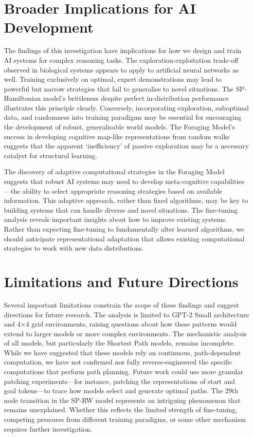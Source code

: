\section{Broader Implications for AI Development}

The findings of this investigation have implications for how we design and train AI systems for complex reasoning tasks. The exploration-exploitation trade-off observed in biological systems appears to apply to artificial neural networks as well. Training exclusively on optimal, expert demonstrations may lead to powerful but narrow strategies that fail to generalise to novel situations. The SP-Hamiltonian model's brittleness despite perfect in-distribution performance illustrates this principle clearly. Conversely, incorporating exploration, suboptimal data, and randomness into training paradigms may be essential for encouraging the development of robust, generalisable world models. The Foraging Model's success in developing cognitive map-like representations from random walks suggests that the apparent `inefficiency' of passive exploration may be a necessary catalyst for structural learning. 

The discovery of adaptive computational strategies in the Foraging Model suggests that robust AI systems may need to develop meta-cognitive capabilities—the ability to select appropriate reasoning strategies based on available information. This adaptive approach, rather than fixed algorithms, may be key to building systems that can handle diverse and novel situations. The fine-tuning analysis reveals important insights about how to improve existing systems. Rather than expecting fine-tuning to fundamentally alter learned algorithms, we should anticipate representational adaptation that allows existing computational strategies to work with new data distributions. 

\section{Limitations and Future Directions}

Several important limitations constrain the scope of these findings and suggest directions for future research. The analysis is limited to GPT-2 Small architecture and 4×4 grid environments, raising questions about how these patterns would extend to larger models or more complex environments. The mechanistic analysis of all models, but particularly the Shortest Path models, remains incomplete. While we have suggested that these models rely on continuous, path-dependent computation, we have not confirmed nor fully reverse-engineered the specific computations that perform path planning. Future work could use more granular patching experiments—for instance, patching the representations of start and goal tokens—to trace how models select and generate optimal paths. The 29th node transition in the SP-RW model represents an intriguing phenomenon that remains unexplained. Whether this reflects the limited strength of fine-tuning, competing pressures from different training paradigms, or some other mechanism requires further investigation. 

